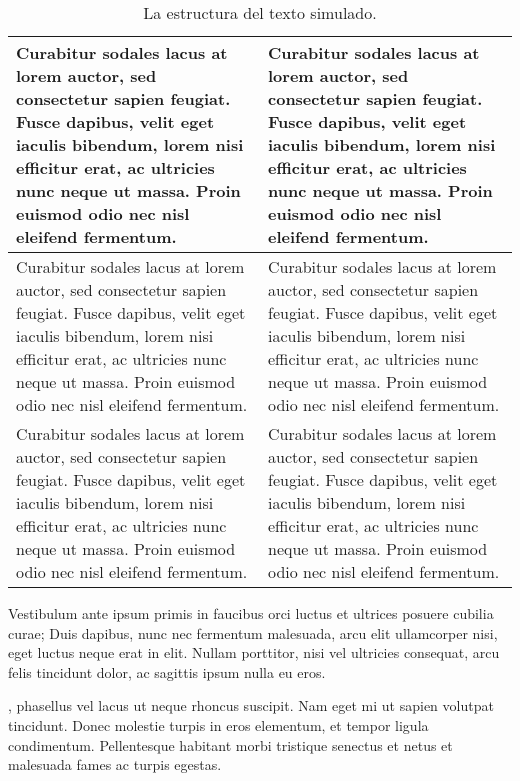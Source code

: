 \begin{table}[!ht]
\sf\footnotesize\setlength\tabcolsep{4pt}
\centering
\begin{tabular}{>{\raggedright\arraybackslash}m{5cm} | >{\raggedright\arraybackslash}m{5cm}}
\toprule
Curabitur sodales lacus at lorem auctor, sed consectetur sapien feugiat. Fusce dapibus, velit eget iaculis bibendum, lorem nisi efficitur erat, ac ultricies nunc neque ut massa. Proin euismod odio nec nisl eleifend fermentum. & Curabitur sodales lacus at lorem auctor, sed consectetur sapien feugiat. Fusce dapibus, velit eget iaculis bibendum, lorem nisi efficitur erat, ac ultricies nunc neque ut massa. Proin euismod odio nec nisl eleifend fermentum.\\
\midrule
Curabitur sodales lacus at lorem auctor, sed consectetur sapien feugiat. Fusce dapibus, velit eget iaculis bibendum, lorem nisi efficitur erat, ac ultricies nunc neque ut massa. Proin euismod odio nec nisl eleifend fermentum. & Curabitur sodales lacus at lorem auctor, sed consectetur sapien feugiat. Fusce dapibus, velit eget iaculis bibendum, lorem nisi efficitur erat, ac ultricies nunc neque ut massa. Proin euismod odio nec nisl eleifend fermentum.\\
\midrule
Curabitur sodales lacus at lorem auctor, sed consectetur sapien feugiat. Fusce dapibus, velit eget iaculis bibendum, lorem nisi efficitur erat, ac ultricies nunc neque ut massa. Proin euismod odio nec nisl eleifend fermentum. & Curabitur sodales lacus at lorem auctor, sed consectetur sapien feugiat. Fusce dapibus, velit eget iaculis bibendum, lorem nisi efficitur erat, ac ultricies nunc neque ut massa. Proin euismod odio nec nisl eleifend fermentum.\\
\bottomrule
\end{tabular}
\caption{La estructura del texto simulado.}\label{cuadro2-1}
\end{table}

Vestibulum ante ipsum primis in faucibus orci luctus et ultrices posuere cubilia curae; Duis dapibus, nunc nec fermentum malesuada, arcu elit ullamcorper nisi, eget luctus neque erat in elit. Nullam porttitor, nisi vel ultricies consequat, arcu felis tincidunt dolor, ac sagittis ipsum nulla eu eros.

, phasellus vel lacus ut neque rhoncus suscipit. Nam eget mi ut sapien volutpat tincidunt. Donec molestie turpis in eros elementum, et tempor ligula condimentum. Pellentesque habitant morbi tristique senectus et netus et malesuada fames ac turpis egestas.


